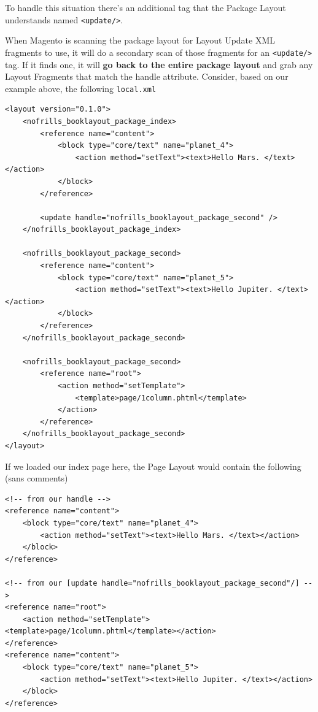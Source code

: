 \documentclass[oneside]{book}
\begin{document}
To handle this situation there's an additional tag that the Package Layout understands named \footnotesize\texttt{\textless update/\textgreater }\normalsize.

When Magento is scanning the package layout for Layout Update XML fragments to use, it will do a secondary scan of those fragments for an \footnotesize\texttt{\textless update/\textgreater } \normalsize  tag.  If it finds one, it will \textbf{go back to the entire package layout} and grab any Layout Fragments that match the handle attribute.  Consider, based on our example above, the following \footnotesize\texttt{local.xml} \normalsize 

\begin{lstlisting}
<layout version="0.1.0">
    <nofrills_booklayout_package_index>
        <reference name="content">
            <block type="core/text" name="planet_4">
                <action method="setText"><text>Hello Mars. </text></action>
            </block>                        
        </reference>

        <update handle="nofrills_booklayout_package_second" />
    </nofrills_booklayout_package_index>

    <nofrills_booklayout_package_second>
        <reference name="content">
            <block type="core/text" name="planet_5">
                <action method="setText"><text>Hello Jupiter. </text></action>
            </block>                        
        </reference>
    </nofrills_booklayout_package_second>   

    <nofrills_booklayout_package_second>    
        <reference name="root">
            <action method="setTemplate">
                <template>page/1column.phtml</template>
            </action>
        </reference>
    </nofrills_booklayout_package_second>
</layout>

\end{lstlisting}


If we loaded our index page here, the Page Layout would contain the following (sans comments)

\begin{lstlisting}
<!-- from our handle -->
<reference name="content">
    <block type="core/text" name="planet_4">
        <action method="setText"><text>Hello Mars. </text></action>
    </block>                        
</reference>

<!-- from our [update handle="nofrills_booklayout_package_second"/] -->
<reference name="root">
    <action method="setTemplate"><template>page/1column.phtml</template></action>
</reference>    
<reference name="content">
    <block type="core/text" name="planet_5">
        <action method="setText"><text>Hello Jupiter. </text></action>
    </block>                        
</reference>

\end{lstlisting}
\end{document}
